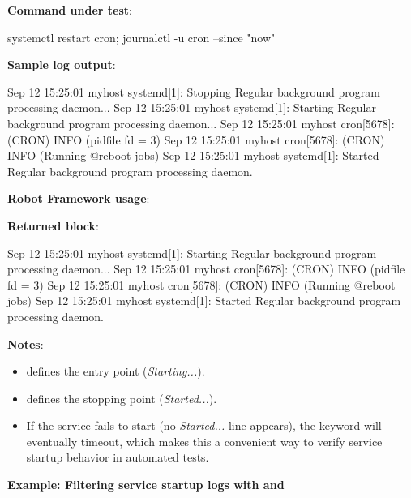 \textbf{Command under test}:
\begin{robotcode}
systemctl restart cron; journalctl -u cron --since "now"
\end{robotcode}

\textbf{Sample log output}:
\begin{robotlog}
Sep 12 15:25:01 myhost systemd[1]: Stopping Regular background program processing daemon...
Sep 12 15:25:01 myhost systemd[1]: Starting Regular background program processing daemon...
Sep 12 15:25:01 myhost cron[5678]: (CRON) INFO (pidfile fd = 3)
Sep 12 15:25:01 myhost cron[5678]: (CRON) INFO (Running @reboot jobs)
Sep 12 15:25:01 myhost systemd[1]: Started Regular background program processing daemon.
\end{robotlog}

\textbf{Robot Framework usage}:

\textbf{Returned block}:
\begin{robotlog}
Sep 12 15:25:01 myhost systemd[1]: Starting Regular background program processing daemon...
Sep 12 15:25:01 myhost cron[5678]: (CRON) INFO (pidfile fd = 3)
Sep 12 15:25:01 myhost cron[5678]: (CRON) INFO (Running @reboot jobs)
Sep 12 15:25:01 myhost systemd[1]: Started Regular background program processing daemon.
\end{robotlog}

\textbf{Notes}:
\begin{itemize}
  \item {} defines the entry point (\emph{Starting...}).
  \item {} defines the stopping point (\emph{Started...}).
  \item If the service fails to start (no \emph{Started...} line appears), the keyword will eventually timeout, which makes this a convenient way to verify service startup behavior in automated tests.
\end{itemize}

\textbf{Example: Filtering service startup logs with  and }

